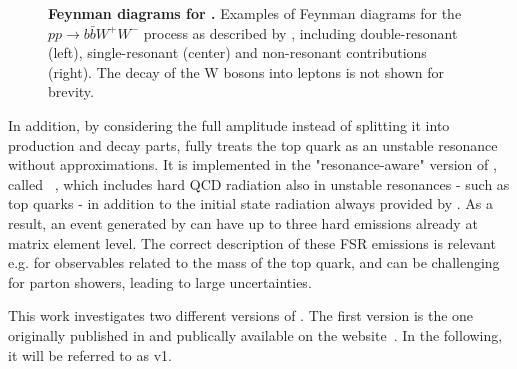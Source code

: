 \begin{figure}[t]
    \caption{\textbf{Feynman diagrams for \bbfourl.} Examples of Feynman diagrams for the $pp \to b \bar{b} W^+ W^-$ process as described by \bbfourl, including double-resonant (left), single-resonant (center) and non-resonant contributions (right). The decay of the W bosons into leptons is not shown for brevity.}
    \label{fig:bb4l:feynman}
\end{figure}

In addition, by considering the full amplitude instead of splitting it into production and decay parts, \bbfourl fully treats the top quark as an unstable resonance without approximations. It is implemented in the "resonance-aware" version of \powheg, called \powhegvres~\cite{Jezo:2015aia}, which includes hard QCD radiation also in unstable resonances - such as top quarks - in addition to the initial state radiation always provided by \powheg. As a result, an event generated by \bbfourl can have up to three hard emissions already at matrix element level. The correct description of these FSR emissions is relevant e.g. for observables related to the mass of the top quark, and can be challenging for parton showers, leading to large uncertainties.

This work investigates two different versions of \bbfourl. The first version is the one originally published in  and publically available on the \powheg website~\cite{Powheg:website}. In the following, it will be referred to as \bbfourl v1.


